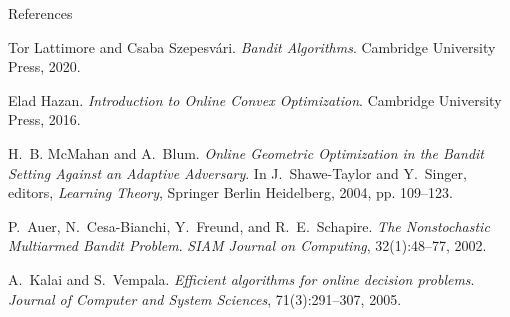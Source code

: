 \documentclass{beamer}
\begin{document}
\begin{frame}[allowframebreaks]{References}
    \begin{thebibliography}{10}

        \beamertemplatebookbibitems
        Tor Lattimore and Csaba Szepesv{\'a}ri.
        \newblock \emph{Bandit Algorithms}.
        \newblock Cambridge University Press, 2020.

        Elad Hazan.
        \newblock \emph{Introduction to Online Convex Optimization}.
        \newblock Cambridge University Press, 2016.

        \beamertemplatearticlebibitems
        H.~B. McMahan and A.~Blum.
        \newblock \emph{Online Geometric Optimization in the Bandit Setting Against an Adaptive Adversary}.
        \newblock In J.~Shawe-Taylor and Y.~Singer, editors, \emph{Learning Theory}, Springer Berlin Heidelberg, 2004, pp. 109--123.

        P.~Auer, N.~Cesa-Bianchi, Y.~Freund, and R.~E.~Schapire.
        \newblock \emph{The Nonstochastic Multiarmed Bandit Problem}.
        \newblock \emph{SIAM Journal on Computing}, 32(1):48--77, 2002.

        A.~Kalai and S.~Vempala.
        \newblock \emph{Efficient algorithms for online decision problems}.
        \newblock \emph{Journal of Computer and System Sciences}, 71(3):291--307, 2005.
    \end{thebibliography}
\end{frame}
\end{document}
